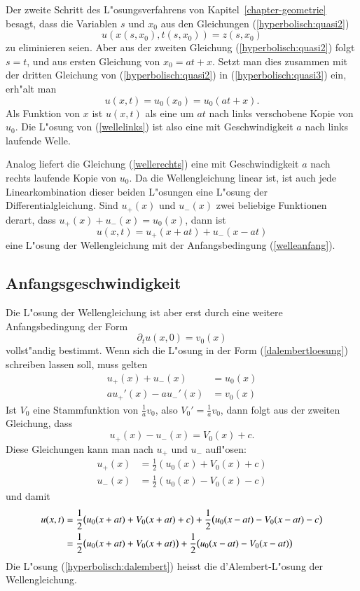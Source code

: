Der zweite Schritt des L"osungsverfahrens von Kapitel~\ref{chapter-geometrie}
besagt, dass die Variablen $s$ und $x_0$ aus den Gleichungen
(\ref{hyperbolisch:quasi2})
\begin{equation}
u(x(s,x_0), t(s,x_0))=z(s,x_0)
\label{hyperbolisch:quasi3}
\end{equation}
zu eliminieren seien.
Aber aus der zweiten Gleichung 
(\ref{hyperbolisch:quasi2})
folgt $s=t$, und aus
ersten Gleichung von
$x_0=at+x$. Setzt man dies zusammen mit der dritten Gleichung von
(\ref{hyperbolisch:quasi2}) in 
(\ref{hyperbolisch:quasi3}) ein, erh"alt man
\[
u(x, t)=u_0(x_0)=u_0(at+x).
\]
Als Funktion von $x$ ist
$u(x,t)$ als eine um $at$ nach links verschobene Kopie von $u_0$.
Die L"osung von (\ref{wellelinks})
ist also eine mit Geschwindigkeit $a$ nach links
laufende Welle.

Analog liefert die Gleichung (\ref{wellerechts}) eine mit Geschwindigkeit
$a$ nach rechts laufende Kopie von $u_0$. Da die Wellengleichung linear ist,
ist auch jede Linearkombination dieser beiden L"osungen eine L"osung der
Differentialgleichung. Sind $u_+(x)$ und $u_-(x)$ zwei beliebige Funktionen
derart, dass $u_+(x)+u_-(x)=u_0(x)$, dann ist
\begin{equation}
u(x,t)=u_+(x+at)+u_-(x-at)
\label{dalembertloesung}
\end{equation}
eine L"osung der Wellengleichung mit der Anfangsbedingung (\ref{welleanfang}).

\subsection{Anfangsgeschwindigkeit}
Die L"osung der Wellengleichung ist aber erst durch eine weitere
Anfangsbedingung der Form
\begin{equation}
\partial_tu(x,0)=v_0(x)\label{welleanfangdt}
\end{equation}
vollst"andig bestimmt.
Wenn sich die L"osung in der Form (\ref{dalembertloesung}) schreiben lassen
soll, muss gelten
\begin{align*}
u_+(x)+u_-(x)&=u_0(x)\\
au_+'(x)-au_-'(x)&=v_0(x)
\end{align*}
Ist $V_0$ eine Stammfunktion von $\frac1av_0$, also $V_0'=\frac1av_0$,
dann folgt aus der zweiten Gleichung, dass 
\[
u_+(x)-u_-(x)=V_0(x)+c.
\]
Diese Gleichungen kann man nach $u_+$ und $u_-$ aufl"osen:
\begin{align*}
u_+(x)&=\frac12(u_0(x)+V_0(x)+c)\\
u_-(x)&=\frac12(u_0(x)-V_0(x)-c)
\end{align*}
und damit
\begin{align}
u(x,t)
&=
\frac12\bigl(u_0(x+at)+V_0(x+at)+c\bigr)+\frac12\bigl(u_0(x-at)-V_0(x-at)-c\bigr)
\notag
\\
&=
\frac12\bigl(u_0(x+at)+V_0(x+at)\bigr)+\frac12\bigl(u_0(x-at)-V_0(x-at)\bigr)
\label{hyperbolisch:dalembert}
\end{align}
Die L"osung (\ref{hyperbolisch:dalembert})
heisst die d'Alembert-L"osung der Wellengleichung.

